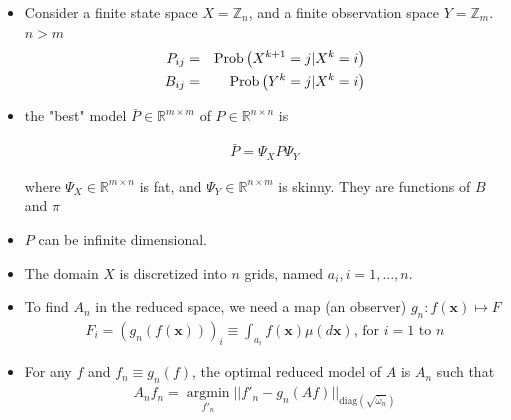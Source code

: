 \documentclass[12pt,t]{beamer}
\begin{document}
\begin{frame}
\begin{itemize}
\item Consider a finite state space $X =\mathbb{Z}_n$, and a finite observation space $Y=\mathbb{Z}_m$. $n>m$
\begin{eqnarray*}
   P_{ij}&=&\operatorname{Prob}\left( X^{k+1}=j| X^k=i \right)\\
   B_{ij}&=&\operatorname{Prob}\left( Y^k=j| X^k=i \right)
\end{eqnarray*}
\item the "best" model $\bar{P} \in \mathbb{R}^{m \times m}$ of $P \in \mathbb{R}^{n \times n}$ is

\begin{eqnarray*}
  \bar{P} = \Psi_X P \Psi_Y
\end{eqnarray*}

where $\Psi_X \in \mathbb{R}^{m \times n}$ is fat, and $\Psi_Y \in \mathbb{R}^{n \times m}$ is skinny. They are functions of $B$ and $\pi$
\item $P$ can be infinite dimensional.
\end{itemize}
\end{frame}






\begin{frame}

\begin{itemize}
   \item The domain $X$ is discretized into $n$ grids, named $a_i, i =1,...,n$.
   \item To find $A_n$ in the reduced space, we need a map (an observer) $g_n: f(\mathbf{x}) \mapsto F $
         \begin{eqnarray*}
    F_i = (g_n(f(\mathbf{x})))_i \equiv \int_{a_i} f(\mathbf{x}) \mu(d\mathbf{x})  \mbox{, for }i = 1 \mbox{ to } n
    \end{eqnarray*}
   \item For any $f$ and $f_n \equiv g_n(f)$, the optimal reduced model of $A$ is $A_n$ such that
    \begin{eqnarray*}
    \label{objfunction}
    A_n f_n = \operatorname*{argmin}_{{f'_n}} || {f'_n} -g_n(Af) ||_{\text{diag}(\sqrt{\bar{\omega}_n})}
    \end{eqnarray*}
\end{itemize}
\end{frame}
\end{document}
